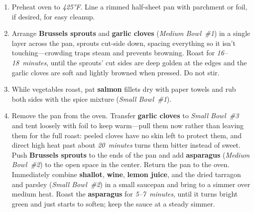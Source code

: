 \documentclass[11pt,letterpaper]{article}
\begin{document}
\begin{enumerate}
    \item Preheat oven to \textit{425°F}. Line a rimmed half-sheet pan with parchment or foil, if desired, for easy cleanup.

    \item Arrange \textbf{Brussels sprouts} and \textbf{garlic cloves} (\textit{Medium Bowl~\#1}) in a single layer across the pan, sprouts cut-side down, spacing everything so it isn't touching---crowding traps steam and prevents browning. Roast for \textit{16--18~minutes}, until the sprouts' cut sides are deep golden at the edges and the garlic cloves are soft and lightly browned when pressed. Do not stir.

    \item While vegetables roast, pat \textbf{salmon} fillets dry with paper towels and rub both sides with the spice mixture (\textit{Small Bowl~\#1}).

    \item Remove the pan from the oven. Transfer \textbf{garlic cloves} to \textit{Small Bowl~\#3} and tent loosely with foil to keep warm---pull them now rather than leaving them for the full roast: peeled cloves have no skin left to protect them, and direct high heat past about \textit{20~minutes} turns them bitter instead of sweet. Push \textbf{Brussels sprouts} to the ends of the pan and add \textbf{asparagus} (\textit{Medium Bowl~\#2}) to the open space in the center. Return the pan to the oven. Immediately combine \textbf{shallot}, \textbf{wine}, \textbf{lemon juice}, and the dried tarragon and parsley (\textit{Small Bowl~\#2}) in a small saucepan and bring to a simmer over medium heat. Roast the \textbf{asparagus} for \textit{5--7~minutes}, until it turns bright green and just starts to soften; keep the sauce at a steady simmer.


\end{enumerate}
\end{document}
